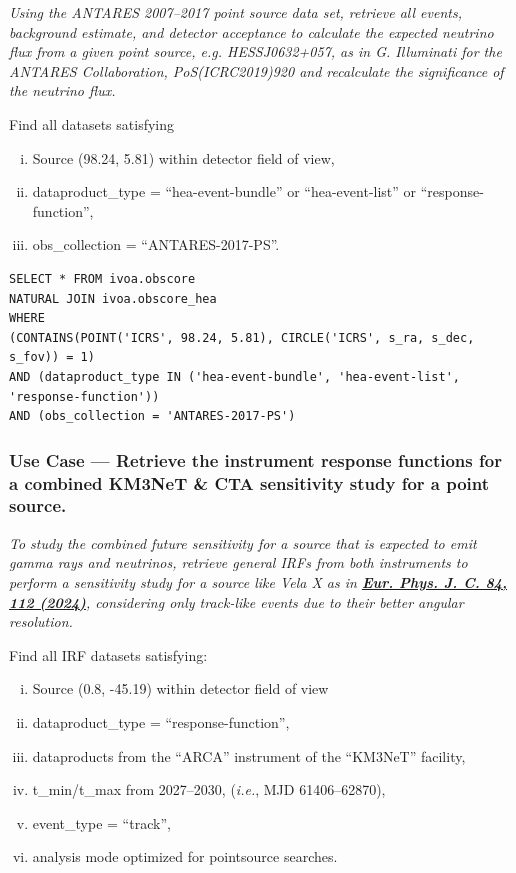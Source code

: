 {\em Using the ANTARES 2007--2017 point source data set, retrieve all events, background estimate, and detector acceptance to calculate the expected neutrino flux from a given point source, e.g. HESSJ0632+057, as in \textit{G. Illuminati for the ANTARES Collaboration, PoS(ICRC2019)920} and recalculate the significance of the neutrino flux.}

\medskip
\noindent Find all datasets satisfying
\begin{enumerate}[(i)]
  \item Source (98.24, 5.81) within detector field of view,
  \item dataproduct\_type = ``hea-event-bundle'' or ``hea-event-list'' or ``response-function'',
  \item obs\_collection = ``ANTARES-2017-PS''.
\end{enumerate}

\begin{verbatim}
SELECT * FROM ivoa.obscore
NATURAL JOIN ivoa.obscore_hea
WHERE
(CONTAINS(POINT('ICRS', 98.24, 5.81), CIRCLE('ICRS', s_ra, s_dec, s_fov)) = 1)
AND (dataproduct_type IN ('hea-event-bundle', 'hea-event-list', 
'response-function'))
AND (obs_collection = 'ANTARES-2017-PS')
\end{verbatim}

\subsubsection{Use Case --- Retrieve the instrument response functions for a combined KM3NeT \& CTA sensitivity study for a point source.}

{\em To study the combined future sensitivity for a source that is expected to emit gamma rays and neutrinos, retrieve general IRFs from both instruments to perform a sensitivity study for a source like Vela X as in \textbf{\hyperref[https://doi.org/10.1140/epjc/s10052-023-12279-z]{Eur. Phys. J. C. 84, 112 (2024)}}, considering only track-like events due to their better angular resolution.}

\medskip
\noindent Find all IRF datasets satisfying:
\begin{enumerate}[(i)]
  \item Source (0.8, -45.19) within detector field of view
  \item dataproduct\_type = ``response-function'',
  \item dataproducts from the ``ARCA'' instrument of the ``KM3NeT'' facility,
  \item t\_min/t\_max from 2027--2030, ({\em i.e.\/}, MJD 61406--62870),
  \item event\_type = ``track'',
  \item analysis mode optimized for pointsource searches.
\end{enumerate}

